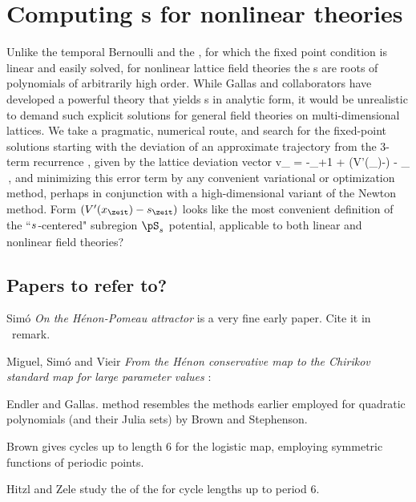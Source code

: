 \section{Computing {\lattstate}s for nonlinear theories}
\label{s:nonlinLattStates}

Unlike the {temporal Bernoulli}  and the
{\templatt} , for which the {\lattstate} fixed
point condition 
is linear and easily solved, for
nonlinear lattice field theories the {\lattstate}s are roots of
polynomials of arbitrarily high order. While Gallas and collaborators%
have developed a powerful theory that yields {\HenonMap} {\po}s in
analytic form, it would be unrealistic to demand such explicit solutions for
general field theories on multi-dimensional lattices. We take a
pragmatic, numerical route, and search for the fixed-point solutions
starting with the deviation of an approximate trajectory from the 3-term
recurrence , given by the lattice deviation vector
\beq
v_{\zeit} = -\ssp_{\zeit+1} + (V'(\ssp_{\zeit})-\Ssym{\zeit}) - \ssp_{}
\,,
and minimizing this error term by any convenient variational or
optimization method, perhaps in conjunction with a high-dimensional
variant of the Newton method.
     {
Form $(V'(\ssp_{\zeit})-\Ssym{\zeit})$ looks like the most convenient
definition of the ``${s_{}}$-centered" subregion $\pS_\Ssym{}$ potential,
applicable to both linear and nonlinear field theories?
    }



\subsection{Papers to refer to?}

Sim{\'o} {\em On the {H{\'e}non-Pomeau} attractor}
is a very fine early paper. Cite it in \Henon\ remark.

Miguel, Sim{\'{o}} and Vieir {\em From the {H{\'{e}}non}
conservative map to the {Chirikov} standard map for large parameter
values} :

Endler and Gallas.
method resembles the methods
earlier employed for quadratic polynomials (and their Julia sets) by
Brown
and Stephenson.

Brown gives cycles up to length 6 for the logistic map,
employing symmetric functions of periodic points.

Hitzl and Zele
study the of the {\HenonMap} for cycle lengths  up to period  6.
